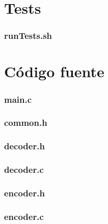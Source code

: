 \section{Tests}\label{appendix_tests}

\subsubsection{runTests.sh}\label{app_run_tests}


\clearpage
\section{Código fuente}\label{appendix_codigo_fuente}

\subsubsection{main.c}\label{app_main}

\clearpage

\subsubsection{common.h}\label{app_common}

\clearpage

\subsubsection{decoder.h}\label{app_decoderH}

\clearpage

\subsubsection{decoder.c}\label{app_decoder}

\clearpage

\subsubsection{encoder.h}\label{app_encoderH}

\clearpage

\subsubsection{encoder.c}\label{app_encoder}

\clearpage


